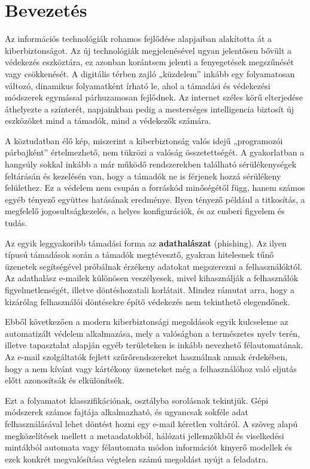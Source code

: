 \chapter{Bevezetés}

Az információs technológiák rohamos fejlődése alapjaiban alakította át a kiberbiztonságot. 
Az új technológiák megjelenésével ugyan jelentősen bővült a védekezés eszköztára, ez azonban korántsem jelenti a fenyegetések megszűnését vagy csökkenését. 
A digitális térben zajló „küzdelem” inkább egy folyamatosan változó, dinamikus folyamatként írható le, 
ahol a támadási és védekezési módszerek egymással párhuzamosan fejlődnek. 
Az internet széles körű elterjedése áthelyezte a színterét, napjainkban pedig a mesterséges intelligencia biztosít új eszközöket mind a támadók, mind a védekezők számára.

A köztudatban élő kép, miszerint a kiberbiztonság valós idejű „programozói párbajként” értelmezhető, nem tükrözi a valóság összetettségét. 
A gyakorlatban a hangsúly sokkal inkább a már működő rendszerekben található sérülékenységek feltárásán és kezelésén van, hogy a támadók ne is férjenek hozzá sérülékeny felülethez. 
Ez a védelem nem csupán a forráskód minőségétől függ, hanem számos egyéb tényező együttes hatásának eredménye. 
Ilyen tényező például a titkosítás, a megfelelő jogosultságkezelés, a helyes konfigurációk, és az emberi figyelem és tudás.

Az egyik leggyakoribb támadási forma az \textbf{adathalászat} (phishing). Az ilyen típusú támadások során a támadók megtévesztő, 
gyakran hitelesnek tűnő üzenetek segítségével próbálnak érzékeny adatokat megszerezni a felhasználóktól. Az adathalász e-mailek különösen veszélyesek, 
mivel kihasználják a felhasználók figyelmetlenségét, illetve döntéshozatali korlátait. Mindez rámutat arra, 
hogy a kizárólag felhasználói döntésekre építő védekezés nem tekinthető elegendőnek.

Ebből következően a modern kiberbiztonsági megoldások egyik kulcseleme az automatizált védelem alkalmazása, mely a valóságban a természetes nyelv terén, 
illetve tapasztalat alapján egyéb területeken is inkább nevezhető félautomatának. 
Az e-mail szolgáltatók fejlett szűrőrendszereket használnak annak érdekében, hogy a nem kívánt vagy kártékony 
üzeneteket még a felhasználóhoz való eljutás előtt azonosítsák és elkülönítsék.

Ezt a folyamatot klasszifikációnak, osztályba sorolásnak tekintjük. 
Gépi módszerek számos fajtája alkalmazható, és ugyancsak sokféle adat felhasználásával lehet döntést hozni egy e-mail kéretlen voltáról. 
A szöveg alapú megközelítések mellett a metaadatokból, hálózati jellemzőkből és viselkedési mintákból automata vagy félautomata módon információt 
kinyerő modellek és ezek konkrét megvalósítása végtelen számú megoldást nyújt a feladatra.

